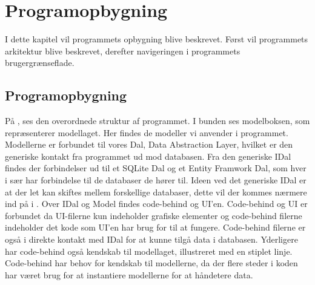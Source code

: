 \chapter{Programopbygning}

I dette kapitel vil programmets opbygning blive beskrevet. Først vil programmets arkitektur blive beskrevet, derefter navigeringen i programmets brugergrænseflade.


\section{Programopbygning}\label{sec:programopbygning}


På , ses den overordnede struktur af programmet.
I bunden ses modelboksen, som repræsenterer modellaget.
Her findes de modeller vi anvender i programmet.
Modellerne er forbundet til vores Dal, Data Abstraction Layer, hvilket er den generiske kontakt fra programmet ud mod databasen.
Fra den generiske IDal findes der forbindelser ud til et SQLite Dal og et Entity Framwork Dal, som hver i sær har forbindelse til de databaser de hører til.
Ideen ved det generiske IDal er at der let kan skiftes mellem forskellige databaser, dette vil der kommes nærmere ind på i .
Over IDal og Model findes code-behind og UI'en.
Code-behind og UI er forbundet da UI-filerne kun indeholder grafiske elementer og code-behind filerne indeholder det kode som UI'en har brug for til at fungere.
Code-behind filerne er også i direkte kontakt med IDal for at kunne tilgå data i databasen.
Yderligere har code-behind også kendskab til modellaget, illustreret med en stiplet linje.
Code-behind har behov for kendskab til modellerne, da der flere steder i koden har været brug for at instantiere modellerne for at håndetere data. 
